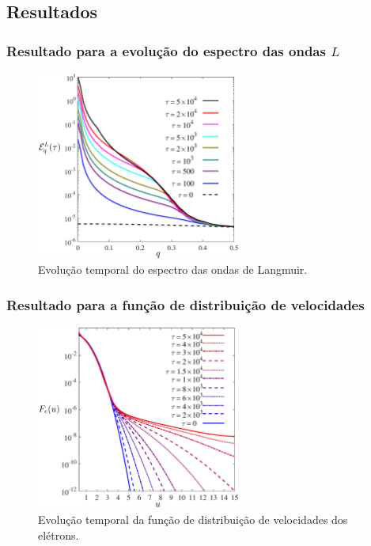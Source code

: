 \documentclass[10pt,aspectratio=1610,lualatex]{beamer}
\begin{document}
\subsection*{Resultados}
\begin{frame}
  \frametitle{Resultado para a evolução do espectro das
  ondas $L$}
  \begin{figure}
    \centering
    \includegraphics[width=0.6\textwidth]{Figure1}
    \caption*{Evolução temporal do espectro das ondas de Langmuir.}
  \end{figure}
\end{frame}

\begin{frame}
  \frametitle{Resultado para a função de distribuição de
  velocidades}
  \begin{figure}
    \centering
    \includegraphics[width=0.6\textwidth]{Figure2}
    \caption*{Evolução temporal da função de distribuição de velocidades
    dos elétrons.}
  \end{figure}
\end{frame}
\end{document}
